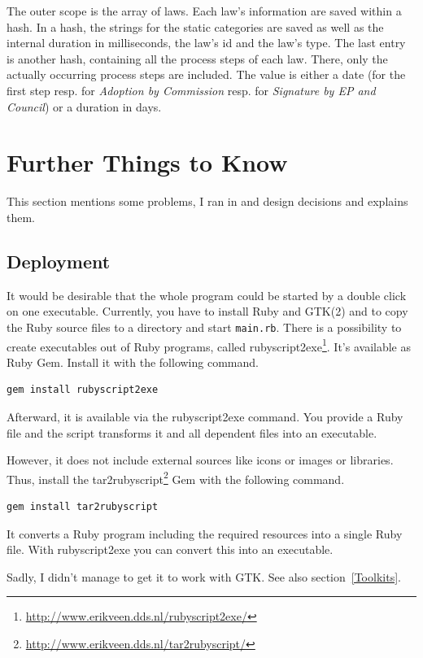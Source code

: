 \documentclass{scrartcl}
\begin{document}
The outer scope is the array of laws. Each law's information are saved within a hash. In a hash, the strings for the static categories are saved as well as the internal duration in milliseconds, the law's id and the law's type. The last entry is another hash, containing all the process steps of each law. There, only the actually occurring process steps are included. The value is either a date (for the first step resp. for \textit{Adoption by Commission} resp. for \textit{Signature by EP and Council}) or a duration in days.






\section{Further Things to Know}
This section mentions some problems, I ran in and design decisions and explains them.


\subsection{Deployment}
\label{Deployment}
It would be desirable that the whole program could be started by a double click on one executable. Currently, you have to install Ruby and GTK(2) and to copy the Ruby source files to a directory and start \texttt{main.rb}.
There is a possibility to create executables out of Ruby programs, called rubyscript2exe\footnote{\url{http://www.erikveen.dds.nl/rubyscript2exe/}}. It's available as Ruby Gem. Install it with the following command.
\begin{verbatim}
gem install rubyscript2exe
\end{verbatim}
Afterward, it is available via the rubyscript2exe command. You provide a Ruby file and the script transforms it and all dependent files into an executable.

However, it does not include external sources like icons or images or libraries. Thus, install the tar2rubyscript\footnote{\url{http://www.erikveen.dds.nl/tar2rubyscript/}} Gem with the following command.
\begin{verbatim}
gem install tar2rubyscript
\end{verbatim}

It converts a Ruby program including the required resources into a single Ruby file. With rubyscript2exe you can convert this into an executable.

Sadly, I didn't manage to get it to work with GTK. See also section~\ref{Toolkits}.
\end{document}
